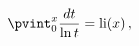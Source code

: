 \[\pvint_{0}^{x}\frac{dt}{\mathop{\ln\/}\nolimits t}=\mathop{\mathrm{li}\/}%
\nolimits\!\left(x\right),\]